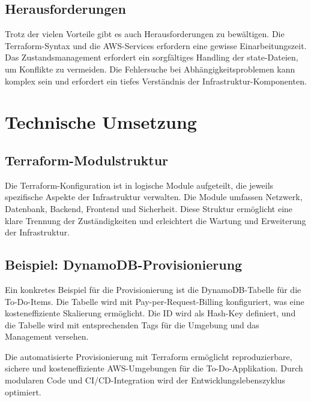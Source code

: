 \subsection{Herausforderungen}
Trotz der vielen Vorteile gibt es auch Herausforderungen zu bewältigen. Die Terraform-Syntax und 
die AWS-Services erfordern eine gewisse Einarbeitungszeit. Das Zustandsmanagement erfordert ein 
sorgfältiges Handling der state-Dateien, um Konflikte zu vermeiden. Die Fehlersuche bei 
Abhängigkeitsproblemen kann komplex sein und erfordert ein tiefes Verständnis der 
Infrastruktur-Komponenten.

\section{Technische Umsetzung}
\subsection{Terraform-Modulstruktur}
Die Terraform-Konfiguration ist in logische Module aufgeteilt, die jeweils spezifische 
Aspekte der Infrastruktur verwalten. Die Module umfassen Netzwerk, Datenbank, Backend, 
Frontend und Sicherheit. Diese Struktur ermöglicht eine klare Trennung der Zuständigkeiten 
und erleichtert die Wartung und Erweiterung der Infrastruktur.

\subsection{Beispiel: DynamoDB-Provisionierung}
Ein konkretes Beispiel für die Provisionierung ist die DynamoDB-Tabelle für die To-Do-Items. 
Die Tabelle wird mit Pay-per-Request-Billing konfiguriert, was eine kosteneffiziente 
Skalierung ermöglicht. Die ID wird als Hash-Key definiert, und die Tabelle wird mit 
entsprechenden Tags für die Umgebung und das Management versehen.

Die automatisierte Provisionierung mit Terraform ermöglicht reproduzierbare, sichere und 
kosteneffiziente AWS-Umgebungen für die To-Do-Applikation. Durch modularen Code und 
CI/CD-Integration wird der Entwicklungslebenszyklus optimiert.